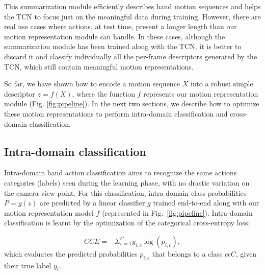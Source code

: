 \documentclass[letterpaper, 10 pt, conference]{ieeeconf}
\begin{document}
This summarization module efficiently describes hand motion sequences and helps the TCN to focus just on the meaningful data during training. However, there are real use cases where actions, at test time, present a longer length than our motion representation module can handle. In these cases, although the summarization module has been trained along with the TCN, it is better to discard it and classify individually all the per-frame descriptors generated by the TCN, which still contain meaningful motion representations. 


So far, we have shown how to encode a motion sequence $X$ into a robust simple descriptor $z = f(X)$, where the function $f$ represents our motion representation module (Fig. \ref{fig:pipeline}). In the next two sections, we describe how to optimize these motion representations to perform intra-domain classification and cross-domain classification.



\subsection{Intra-domain classification}\label{sec:intra_dom}

Intra-domain hand action classification aims to recognize the same actions categories (labels) seen during the learning phase, with no drastic variation on the camera view-point. For this classification, intra-domain class probabilities $P = g(z)$ are predicted by a linear classifier \(g\) trained end-to-end along with our motion representation model \(f\) (represented in Fig.~\ref{fig:pipeline}). Intra-domain classification is learnt by the optimization of the categorical cross-entropy loss:

\begin{equation}
CCE = -\Sigma_{c=1}^{C} y_{i, c} \log \left(p_{i, c}\right),
\end{equation}
which evaluates the predicted probabilities \(p_{i,c}\) that belongs to a class \(c \epsilon C\), given their true label \(y_i\).
\end{document}
